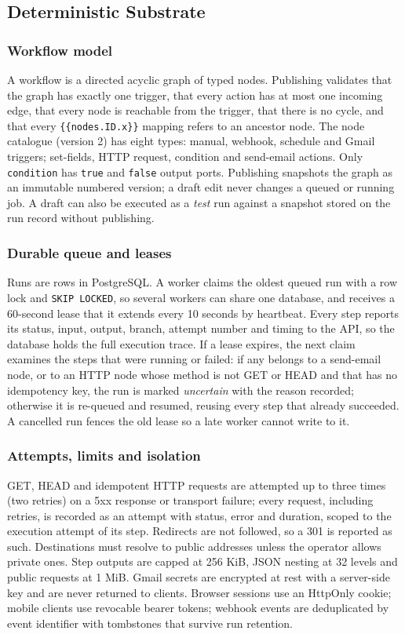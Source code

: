 \documentclass[conference]{IEEEtran}
\begin{document}
\subsection{Deterministic Substrate}
\subsubsection{Workflow model}
A workflow is a directed acyclic graph of typed nodes. Publishing validates that the graph has exactly one trigger, that every action has at most one incoming edge, that every node is reachable from the trigger, that there is no cycle, and that every \texttt{\{\{nodes.ID.x\}\}} mapping refers to an ancestor node. The node catalogue (version 2) has eight types: manual, webhook, schedule and Gmail triggers; set-fields, HTTP request, condition and send-email actions. Only \texttt{condition} has \texttt{true} and \texttt{false} output ports. Publishing snapshots the graph as an immutable numbered version; a draft edit never changes a queued or running job. A draft can also be executed as a \emph{test} run against a snapshot stored on the run record without publishing.

\subsubsection{Durable queue and leases}
Runs are rows in PostgreSQL. A worker claims the oldest queued run with a row lock and \texttt{SKIP LOCKED}, so several workers can share one database, and receives a 60-second lease that it extends every 10 seconds by heartbeat. Every step reports its status, input, output, branch, attempt number and timing to the API, so the database holds the full execution trace. If a lease expires, the next claim examines the steps that were running or failed: if any belongs to a send-email node, or to an HTTP node whose method is not GET or HEAD and that has no idempotency key, the run is marked \emph{uncertain} with the reason recorded; otherwise it is re-queued and resumed, reusing every step that already succeeded. A cancelled run fences the old lease so a late worker cannot write to it.

\subsubsection{Attempts, limits and isolation}
GET, HEAD and idempotent HTTP requests are attempted up to three times (two retries) on a 5xx response or transport failure; every request, including retries, is recorded as an attempt with status, error and duration, scoped to the execution attempt of its step. Redirects are not followed, so a 301 is reported as such. Destinations must resolve to public addresses unless the operator allows private ones. Step outputs are capped at 256 KiB, JSON nesting at 32 levels and public requests at 1 MiB. Gmail secrets are encrypted at rest with a server-side key and are never returned to clients. Browser sessions use an HttpOnly cookie; mobile clients use revocable bearer tokens; webhook events are deduplicated by event identifier with tombstones that survive run retention.
\end{document}
